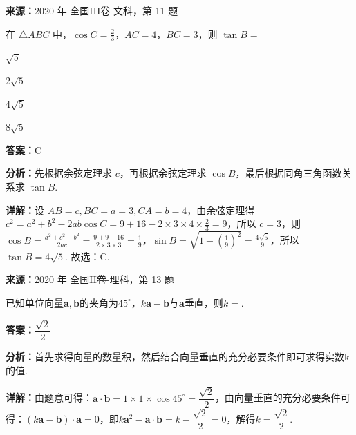 \begin{question}[points=5]
\textbf{来源：}2020 年 全国III卷-文科，第 11 题\par
在 $\triangle ABC$ 中，$\cos C=\frac{2}{3}$，$AC=4$，$BC=3$，则 $\tan B=$
\begin{choices}
  \item $\sqrt{5}$
  \item $2\sqrt{5}$
  \item $4\sqrt{5}$
  \item $8\sqrt{5}$
\end{choices}
\begin{solution}
\textbf{答案：}C

\textbf{分析：}先根据余弦定理求 $c$，再根据余弦定理求 $\cos B$，最后根据同角三角函数关系求 $\tan B$.

\textbf{详解：}设 $AB=c, BC=a=3, CA=b=4$，由余弦定理得 $c^2=a^2+b^2-2ab\cos C=9+16-2\times3\times4\times\frac{2}{3}=9$，所以 $c=3$，则 $\cos B=\frac{a^2+c^2-b^2}{2ac}=\frac{9+9-16}{2\times3\times3}=\frac{1}{9}$，$\sin B=\sqrt{1-(\frac{1}{9})^2}=\frac{4\sqrt{5}}{9}$，所以 $\tan B=4\sqrt{5}$. 故选：C.
\end{solution}
\end{question}

\begin{question}[points=5]
\textbf{来源：}2020 年 全国II卷-理科，第 13 题\par
已知单位向量$\boldsymbol{a},\boldsymbol{b}$的夹角为$45^\circ$，$k\boldsymbol{a}-\boldsymbol{b}$与$\boldsymbol{a}$垂直，则$k=$.
\begin{solution}
\textbf{答案：}$\dfrac{\sqrt2}{2}$

\textbf{分析：}首先求得向量的数量积，然后结合向量垂直的充分必要条件即可求得实数k的值.

\textbf{详解：}由题意可得：$\boldsymbol{a}\cdot\boldsymbol{b}=1\times1\times\cos45^\circ=\dfrac{\sqrt2}{2}$，由向量垂直的充分必要条件可得：$(k\boldsymbol{a}-\boldsymbol{b})\cdot\boldsymbol{a}=0$，即$k\boldsymbol{a}^2-\boldsymbol{a}\cdot\boldsymbol{b}=k-\dfrac{\sqrt2}{2}=0$，解得$k=\dfrac{\sqrt2}{2}$.
\end{solution}
\end{question}

